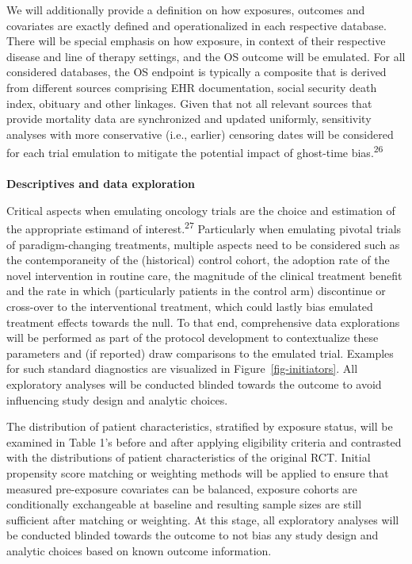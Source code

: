 \documentclass[
  letterpaper,
  DIV=11,
  numbers=noendperiod]{scrartcl}
\makeatletter
\let\oldparagraph\paragraph
\renewcommand{\paragraph}{
    \@ifstar
      \xxxParagraphStar
      \xxxParagraphNoStar
  }
\newcommand{\xxxParagraphStar}[1]{\oldparagraph*{#1}\mbox{}}
\newcommand{\xxxParagraphNoStar}[1]{\oldparagraph{#1}\mbox{}}
\makeatother
\begin{document}
We will additionally provide a definition on how exposures, outcomes and
covariates are exactly defined and operationalized in each respective
database. There will be special emphasis on how exposure, in context of
their respective disease and line of therapy settings, and the OS
outcome will be emulated. For all considered databases, the OS endpoint
is typically a composite that is derived from different sources
comprising EHR documentation, social security death index, obituary and
other linkages. Given that not all relevant sources that provide
mortality data are synchronized and updated uniformly, sensitivity
analyses with more conservative (i.e., earlier) censoring dates will be
considered for each trial emulation to mitigate the potential impact of
ghost-time bias.\textsuperscript{26}

\paragraph{\texorpdfstring{\textbf{Descriptives and data
exploration}}{Descriptives and data exploration}}\label{descriptives-and-data-exploration}

Critical aspects when emulating oncology trials are the choice and
estimation of the appropriate estimand of interest.\textsuperscript{27}
Particularly when emulating pivotal trials of paradigm-changing
treatments, multiple aspects need to be considered such as the
contemporaneity of the (historical) control cohort, the adoption rate of
the novel intervention in routine care, the magnitude of the clinical
treatment benefit and the rate in which (particularly patients in the
control arm) discontinue or cross-over to the interventional treatment,
which could lastly bias emulated treatment effects towards the null. To
that end, comprehensive data explorations will be performed as part of
the protocol development to contextualize these parameters and (if
reported) draw comparisons to the emulated trial. Examples for such
standard diagnostics are visualized in Figure~\ref{fig-initiators}. All
exploratory analyses will be conducted blinded towards the outcome to
avoid influencing study design and analytic choices.

The distribution of patient characteristics, stratified by exposure
status, will be examined in Table 1's before and after applying
eligibility criteria and contrasted with the distributions of patient
characteristics of the original RCT. Initial propensity score matching
or weighting methods will be applied to ensure that measured
pre-exposure covariates can be balanced, exposure cohorts are
conditionally exchangeable at baseline and resulting sample sizes are
still sufficient after matching or weighting. At this stage, all
exploratory analyses will be conducted blinded towards the outcome to
not bias any study design and analytic choices based on known outcome
information.
\end{document}
